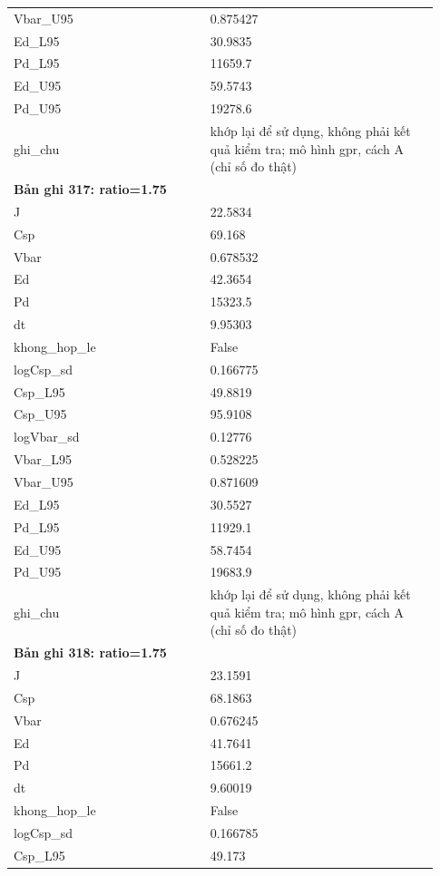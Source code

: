 \begin{longtable}{p{0.43\linewidth}p{0.50\linewidth}}
Vbar\_\allowbreak U95 & 0.875427 \\
Ed\_\allowbreak L95 & 30.9835 \\
Pd\_\allowbreak L95 & 11659.7 \\
Ed\_\allowbreak U95 & 59.5743 \\
Pd\_\allowbreak U95 & 19278.6 \\
ghi\_\allowbreak chu & khớp lại để sử dụng, không phải kết quả kiểm tra; mô hình gpr, cách A (chỉ số đo thật) \\
\midrule
\multicolumn{2}{p{0.95\linewidth}}{\textbf{Bản ghi 317: ratio=1.75}} \\
J & 22.5834 \\
Csp & 69.168 \\
Vbar & 0.678532 \\
Ed & 42.3654 \\
Pd & 15323.5 \\
dt & 9.95303 \\
khong\_\allowbreak hop\_\allowbreak le & False \\
logCsp\_\allowbreak sd & 0.166775 \\
Csp\_\allowbreak L95 & 49.8819 \\
Csp\_\allowbreak U95 & 95.9108 \\
logVbar\_\allowbreak sd & 0.12776 \\
Vbar\_\allowbreak L95 & 0.528225 \\
Vbar\_\allowbreak U95 & 0.871609 \\
Ed\_\allowbreak L95 & 30.5527 \\
Pd\_\allowbreak L95 & 11929.1 \\
Ed\_\allowbreak U95 & 58.7454 \\
Pd\_\allowbreak U95 & 19683.9 \\
ghi\_\allowbreak chu & khớp lại để sử dụng, không phải kết quả kiểm tra; mô hình gpr, cách A (chỉ số đo thật) \\
\midrule
\multicolumn{2}{p{0.95\linewidth}}{\textbf{Bản ghi 318: ratio=1.75}} \\
J & 23.1591 \\
Csp & 68.1863 \\
Vbar & 0.676245 \\
Ed & 41.7641 \\
Pd & 15661.2 \\
dt & 9.60019 \\
khong\_\allowbreak hop\_\allowbreak le & False \\
logCsp\_\allowbreak sd & 0.166785 \\
Csp\_\allowbreak L95 & 49.173 \\

\end{longtable}
